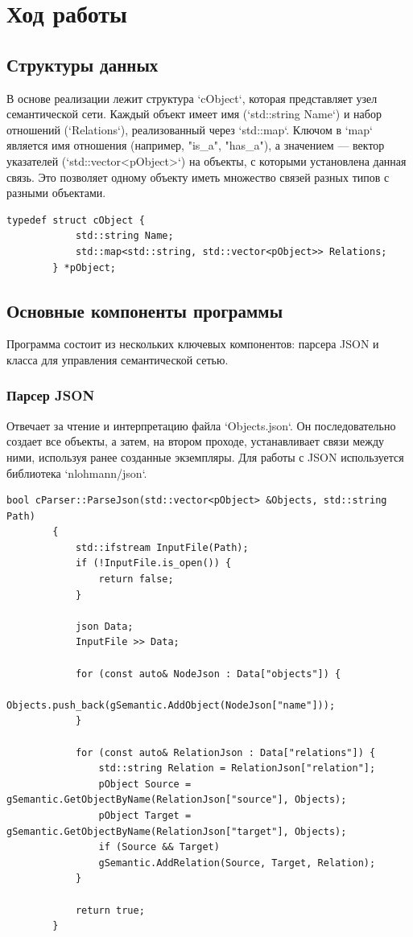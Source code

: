 \documentclass[12pt,a4paper]{scrartcl}
\begin{document}
	
	\section{Ход работы}
	\label{sec:exp}
	
	\subsection{Структуры данных}
	\label{sec:exp:struct}
	В основе реализации лежит структура `cObject`, которая представляет узел семантической сети. Каждый объект имеет имя (`std::string Name`) и набор отношений (`Relations`), реализованный через `std::map`. Ключом в `map` является имя отношения (например, "is\_a", "has\_a"), а значением — вектор указателей (`std::vector<pObject>`) на объекты, с которыми установлена данная связь. Это позволяет одному объекту иметь множество связей разных типов с разными объектами.
	
	\begin{lstlisting}[caption={Определение структуры объекта}]
		typedef struct cObject {
			std::string Name;
			std::map<std::string, std::vector<pObject>> Relations;
		} *pObject;
	\end{lstlisting}
	
	\subsection{Основные компоненты программы}
	\label{sec:exp:components}
	Программа состоит из нескольких ключевых компонентов: парсера JSON и класса для управления семантической сетью.
	
	\subsubsection{Парсер JSON}
	Отвечает за чтение и интерпретацию файла `Objects.json`. Он последовательно создает все объекты, а затем, на втором проходе, устанавливает связи между ними, используя ранее созданные экземпляры. Для работы с JSON используется библиотека `nlohmann/json`.
	
	\begin{lstlisting}[caption={Функция парсинга JSON}]
		bool cParser::ParseJson(std::vector<pObject> &Objects, std::string Path)
		{
			std::ifstream InputFile(Path);
			if (!InputFile.is_open()) {
				return false;
			}
			
			json Data;
			InputFile >> Data;
			
			for (const auto& NodeJson : Data["objects"]) {
				Objects.push_back(gSemantic.AddObject(NodeJson["name"]));
			}
			
			for (const auto& RelationJson : Data["relations"]) {
				std::string Relation = RelationJson["relation"];
				pObject Source = gSemantic.GetObjectByName(RelationJson["source"], Objects);
				pObject Target = gSemantic.GetObjectByName(RelationJson["target"], Objects);
				if (Source && Target)
				gSemantic.AddRelation(Source, Target, Relation);
			}
			
			return true;
		}
	\end{lstlisting}
	
\end{document}
